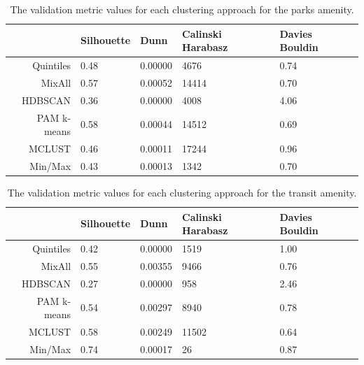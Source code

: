 \documentclass[11pt, a4paper]{article}
\begin{document}
\centering
\begin{longtable}[h]{|r|llll|}
\caption[Parks validation metrics]{The validation metric values for each clustering approach for the parks amenity.}\label{parksvalid}
\endfirsthead
\endhead
  \hline
 & Silhouette & Dunn & Calinski Harabasz & Davies Bouldin \\ 
  \hline
Quintiles & 0.48 & 0.00000 &  4676 & 0.74 \\ 
   \hline
MixAll & 0.57 & \cellcolor{gray!25} 0.00052 & 14414 & 0.70 \\ 
   \hline
HDBSCAN & 0.36 & 0.00000 &  4008 & 4.06 \\ 
   \hline
PAM k-means & \cellcolor{gray!25} 0.58 & 0.00044 & 14512 & \cellcolor{gray!25} 0.69 \\ 
   \hline
MCLUST & 0.46 & 0.00011 & \cellcolor{gray!25} 17244 & 0.96 \\ 
   \hline
Min/Max & 0.43 & 0.00013 &  1342 & 0.70 \\ 
   \hline
\end{longtable}









\centering
\begin{longtable}[h]{|r|llll|}
\caption[Transit validation metrics]{The validation metric values for each clustering approach for the transit amenity.}\label{transitvalid}
\endfirsthead
\endhead
  \hline
 & Silhouette & Dunn & Calinski Harabasz & Davies Bouldin \\ 
  \hline
Quintiles & 0.42 & 0.00000 &  1519 & 1.00 \\ 
   \hline
MixAll & 0.55 & \cellcolor{gray!25} 0.00355 &  9466 & 0.76 \\ 
   \hline
HDBSCAN & 0.27 & 0.00000 &   958 & 2.46 \\ 
   \hline
PAM k-means & 0.54 & 0.00297 &  8940 & 0.78 \\ 
   \hline
MCLUST & 0.58 & 0.00249 & \cellcolor{gray!25} 11502 & \cellcolor{gray!25} 0.64 \\ 
   \hline
Min/Max & \cellcolor{gray!25} 0.74 & 0.00017 &    26 & 0.87 \\ 
   \hline
\end{longtable}
\end{document}
